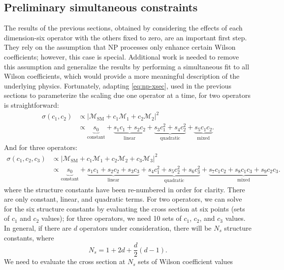 \subsection{Preliminary simultaneous constraints}
\label{ssec:simultaneous-eft}
The results of the previous sections, obtained by considering the effects of
each dimension-six operator with the others fixed to zero, are an important
first step. They rely on the assumption that NP processes only enhance certain
Wilson coefficients; however, this case is special. Additional work is needed to
remove this assumption and generalize the results by performing a simultaneous
fit to all Wilson coefficients, which would provide a more meaningful
description of the underlying physics. Fortunately, adapting \cref{eq:np-xsec},
used in the previous sections to parameterize the scaling due one operator at a
time, for two operators is straightforward:
\begin{align}
  \sigma(c_1, c_2) &\propto \lvert\mathcal{M}_\text{SM} + c_1\mathcal{M}_1 + c_2\mathcal{M}_2\rvert^2 \\
  &\propto
  \underbrace{s_0}_{\text{constant}} +
  \underbrace{s_1 c_1 + s_2 c_2}_{\text{linear}} +
  \underbrace{s_3 c_1^2 + s_4 c_2^2}_{\text{quadratic}} +
  \underbrace{s_5 c_1 c_2}_{\text{mixed}}.
  \label{eq:2d}
\end{align}
And for three operators:
\begin{align}
  \sigma(c_1, c_2, c_3) &\propto \lvert\mathcal{M}_\text{SM} + c_1\mathcal{M}_1 + c_2\mathcal{M}_2 + c_3\mathcal{M}_3\rvert^2 \\
                        &\propto \underbrace{s_0}_{\text{constant}} +
  \underbrace{s_1 c_1 + s_2 c_2 +s_3 c_3}_{\text{linear}} +
  \underbrace{s_4 c_1^2 + s_5 c_2^2 + s_6 c_3^2}_{\text{quadratic}} +
  \underbrace{s_7 c_1 c_2 + s_8 c_1 c_3 + s_9 c_2 c_3}_{\text{mixed}}.
\end{align}
where the structure constants have been re-numbered in order for clarity. There
are only constant, linear, and quadratic terms. For two operators, we can solve
for the six structure constants by evaluating the cross section at six points
(sets of $c_1$ and $c_2$ values); for three operators, we need 10 sets of $c_1$,
$c_2$, and $c_3$ values. In general, if there are $d$ operators under
consideration, there will be $N_s$ structure constants, where
\begin{equation}
  N_s = 1 + 2d + \frac{d}{2}(d - 1).
  \label{eq:nd}
\end{equation}
We need to evaluate the cross section at $N_s$ sets of Wilson coefficient values
